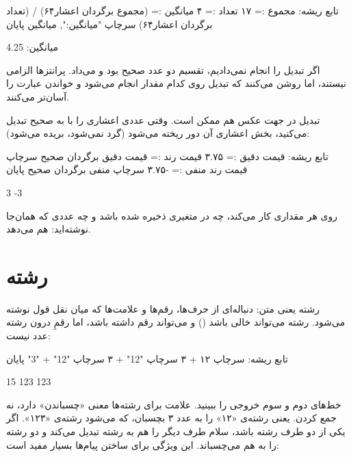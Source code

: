 \begin{salamfa}
تابع ریشه:
    مجموع := ۱۷
    تعداد := ۴
    میانگین := (مجموع برگردان اعشار۶۴) / (تعداد برگردان اعشار۶۴)
    سرچاپ "میانگین:", میانگین
پایان
\end{salamfa}

\begin{outputfa}
میانگین: 4.25
\end{outputfa}

اگر تبدیل را انجام نمی‌دادیم،  تقسیم دو عدد
صحیح بود و  می‌داد. پرانتزها الزامی نیستند، اما روشن می‌کنند که
تبدیل روی کدام مقدار انجام می‌شود و خواندن عبارت را آسان‌تر می‌کنند.

تبدیل در جهت عکس هم ممکن است. وقتی عددی اعشاری را با  به صحیح
تبدیل می‌کنید، بخش اعشاری آن دور ریخته می‌شود (گرد نمی‌شود، بریده می‌شود):

\begin{salamfa}
تابع ریشه:
    قیمت دقیق := ۳.۷۵
    قیمت رند := قیمت دقیق برگردان صحیح
    سرچاپ قیمت رند
    منفی := -۳.۷۵
    سرچاپ منفی برگردان صحیح
پایان
\end{salamfa}

\begin{outputfa}
3
-3
\end{outputfa}

\begin{note}
 روی هر مقداری کار می‌کند، چه در متغیری ذخیره شده باشد و چه
عددی که همان‌جا نوشته‌اید:  هم  می‌دهد.
\end{note}

\section{رشته}

رشته یعنی متن: دنباله‌ای از حرف‌ها، رقم‌ها و علامت‌ها که میان نقل قول
نوشته می‌شود. رشته می‌تواند خالی باشد () و می‌تواند رقم داشته باشد،
اما رقمِ درون رشته عدد نیست:

\begin{salamfa}
تابع ریشه:
    سرچاپ ۱۲ + ۳
    سرچاپ "12" + ۳
    سرچاپ "12" + "3"
پایان
\end{salamfa}

\begin{outputfa}
15
123
123
\end{outputfa}

خط‌های دوم و سوم خروجی را ببینید. علامت \code{+} برای رشته‌ها معنی «چسباندن» دارد،
نه جمع کردن.  یعنی رشته‌ی «۱۲» را به عدد ۳ بچسبان، که
می‌شود رشته‌ی «۱۲۳». اگر یکی از دو طرف \code{+} رشته باشد، سلام طرف دیگر را
هم به رشته تبدیل می‌کند و دو رشته را به هم می‌چسباند. این ویژگی برای ساختن
پیام‌ها بسیار مفید است:

